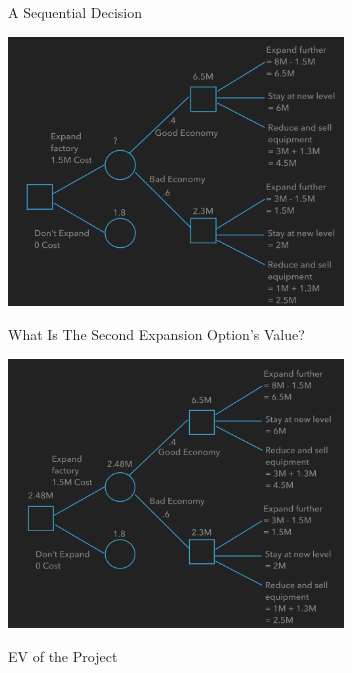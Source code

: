 \documentclass{beamer}\usepackage[]{graphicx}\usepackage[]{color}
\begin{document}
\begin{darkframes}
    \begin{frame}[fragile]{A Sequential Decision}
      \begin{center}
        \includegraphics[width=3.5in]{SequentialDecision} \\
      \end{center}

    \lc %
    \end{frame}


    \begin{frame}[fragile]{What Is The Second Expansion Option's Value?}
      \begin{center}
        \includegraphics[width=3.5in]{FinalOption} \\
      \end{center}
    \end{frame}


    \begin{frame}[fragile]{EV of the Project}
    \end{frame}



\end{darkframes}
\end{document}
